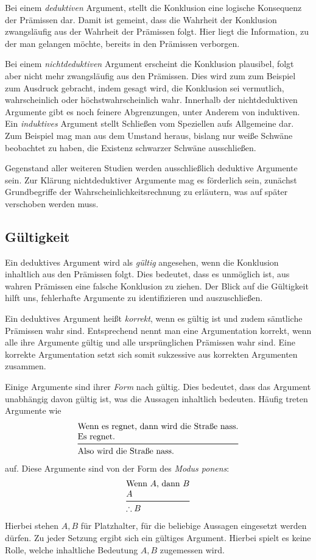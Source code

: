 Bei einem \emph{deduktiven} Argument, stellt die Konklusion eine logische
Konsequenz der Prämissen dar. Damit ist gemeint, dass die Wahrheit der
Konklusion zwangsläufig aus der Wahrheit der Prämissen folgt. Hier liegt
die Information, zu der man gelangen möchte, bereits in den Prämissen
verborgen.

Bei einem \emph{nichtdeduktiven} Argument erscheint die Konklusion
plausibel, folgt aber nicht mehr zwangsläufig aus den Prämissen. Dies
wird zum zum Beispiel zum Ausdruck gebracht, indem gesagt wird, die
Konklusion sei vermutlich, wahrscheinlich oder höchstwahrscheinlich wahr.
Innerhalb der nichtdeduktiven Argumente gibt es noch feinere Abgrenzungen,
unter Anderem von induktiven. Ein \emph{induktives} Argument stellt
Schließen vom Speziellen aufs Allgemeine dar. Zum Beispiel mag man
aus dem Umstand heraus, bislang nur weiße Schwäne beobachtet zu haben,
die Existenz schwarzer Schwäne ausschließen.

Gegenstand aller weiteren Studien werden ausschließlich deduktive
Argumente sein. Zur Klärung nichtdeduktiver Argumente mag es förderlich
sein, zunächst Grundbegriffe der Wahrscheinlichkeitsrechnung
zu erläutern, was auf später verschoben werden muss.

\subsection{Gültigkeit}

Ein deduktives Argument wird als \emph{gültig} angesehen, wenn die
Konklusion inhaltlich aus den Prämissen folgt. Dies bedeutet, dass es
unmöglich ist, aus wahren Prämissen eine falsche Konklusion zu ziehen.
Der Blick auf die Gültigkeit hilft uns, fehlerhafte Argumente zu
identifizieren und auszuschließen.

Ein deduktives Argument heißt \emph{korrekt}, wenn es gültig ist und
zudem sämtliche Prämissen wahr sind. Entsprechend nennt man eine
Argumentation korrekt, wenn alle ihre Argumente gültig und alle
ursprünglichen Prämissen wahr sind. Eine korrekte Argumentation setzt
sich somit sukzessive aus korrekten Argumenten zusammen.

Einige Argumente sind ihrer \emph{Form} nach gültig. Dies bedeutet,
dass das Argument unabhängig davon gültig ist, was die Aussagen
inhaltlich bedeuten. Häufig treten Argumente wie
\[\begin{array}{@{}l@{}}
\text{Wenn es regnet, dann wird die Straße nass.}\\
\text{Es regnet.}\\
\midrule[\inferrulewidth]
\text{Also wird die Straße nass.}
\end{array}\]
auf. Diese Argumente sind von der Form des \emph{Modus ponens}:
\[\begin{array}{@{}l@{}}
\text{Wenn $A$, dann $B$}\\
\text{$A$}\\
\midrule[\inferrulewidth]
\therefore\text{$B$}
\end{array}\]
Hierbei stehen $A,B$ für Platzhalter, für die beliebige Aussagen
eingesetzt werden dürfen. Zu jeder Setzung ergibt sich ein gültiges
Argument. Hierbei spielt es keine Rolle, welche inhaltliche Bedeutung
$A,B$ zugemessen wird.

